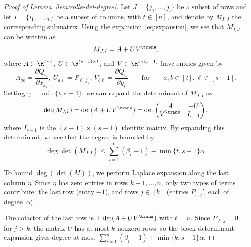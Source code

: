\begin{proof}[Proof of Lemma~\ref{lem:rolle-det-degree}]
Let $J=\{j_1,\dots,j_t\}$ be a subset of rows and let $I=\{i_1,\dots,i_t\}$ be a subset of columns, with $t\in [n]$, and denote by $M_{I,J}$ the corresponding submatrix. Using 
the expansion~\eqref{eq:expansion}, we see that $M_{I,J}$ can 
be written as
\begin{equation*}
  M_{J,I} = A + UV^\trans,
\end{equation*}
where $A\in \R^{t\times t}$, $U\in \R^{(s-1)\times t}$, and $V\in \R^{t\times (s-1)}$ have entries given by
\begin{equation*}
  A_{ab} = \frac{\partial Q_{i_a}}{\partial x_{j_b}}, \ U_{a\ell} = P_{\ell,j_a}, \ V_{b\ell} = \frac{\partial Q_{i_b}}{\partial y_\ell} \qquad \text{for} \qquad a, b \in [t], \ell \in [s-1].
\end{equation*} 
Setting $\gamma = \min \{t,s-1\}$, we can expand the determinant of $M_{J,I}$ as
\begin{equation*}
 \det(M_{J,I}) = \det(A+UV^\trans) = \det\begin{pmatrix} A & -U \\ V^{\trans} & I_{s-1}\end{pmatrix},
\end{equation*}
where $I_{s-1}$ is the $(s-1)\times (s-1)$ identity matrix. By expanding this determinant, we see that the degree is bounded by
\begin{equation}\label{eqn:deg-bound-submatrix}
  \deg \det(M_{J,I})\leq \sum_{i=1}^t (\beta_i-1)+\min\{t,s-1\}\alpha.
\end{equation}

To bound $\deg(\det(M))$, we perform Laplace expansion along the last column $\eta$. Since $\eta$ has zero entries in rows $k+1,\dots,n$, only two types of terms contribute: the last row (entry $-1$), and rows $j\in [k]$ (entries $P_{s,j}'$, each of degree~$\alpha$).

The cofactor of the last row is $\pm\det(A + UV^\trans)$ with $t = n$. Since $P_{\ell,j} = 0$ for $j > k$, the matrix $U$ has at most $k$ nonzero rows, so the block determinant expansion gives degree at most $\sum_{i=1}^n(\beta_i-1) + \min\{k,s-1\}\alpha$.


\end{proof}
